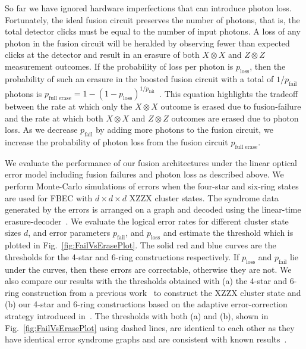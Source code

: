 \documentclass[reprint,
groupedaddress,
 prl,amsmath,amssymb,
 aps]{revtex4-2}
\theoremstyle{definition}
\begin{document}
\begin{bibunit}
So far we have ignored hardware imperfections that can introduce photon loss. Fortunately, the ideal fusion circuit preserves the number of photons, that is, the total detector clicks must be equal to the number of input photons. A loss of any photon in the fusion circuit will be heralded by observing fewer than expected clicks at the detector and result in an erasure of both $X\otimes X$ and $Z\otimes Z$ measurement outcomes. If the probability of loss per photon is $p_\mathrm{loss}$, then the probability of such an erasure in the boosted fusion circuit with a total of $1/p_\mathrm{fail}$ photons is $p_\mathrm{full\; erase}=1-(1-p_\mathrm{loss})^{1/p_\mathrm{fail}}$~\cite{bartolucci2021fusion}. This equation highlights the tradeoff between the rate at which only the $X\otimes X$ outcome is erased due to fusion-failure and the rate at which both $X\otimes X$ and $Z\otimes Z$ outcomes are erased due to photon loss. As we decrease $p_\mathrm{fail}$ by adding more photons to the fusion circuit, we increase the probability of photon loss from the fusion circuit $p_\mathrm{full\; erase}$.
 
 
{W}e evaluate the performance of our fusion architectures under the linear optical error model including fusion failures and photon loss as described above. We perform Monte-Carlo simulations of errors when the four-star and six-ring states are used for FBEC with $d\times d\times d$ XZZX cluster states. The syndrome data generated by the errors is arranged on a graph and decoded using the linear-time erasure-decoder~\cite{delfosse2020linear}. We evaluate the logical error rates for different cluster state sizes $d$, and error parameters $p_{\mathrm{fail}}$, and $p_\mathrm{loss}$ and estimate the threshold which is plotted in Fig.~\ref{fig:FailVsErasePlot}. The solid red and blue curves are the thresholds for the 4-star and 6-ring constructions respectively. If $p_\mathrm{loss}$ and $p_\mathrm{fail}$ lie under the curves, then these errors are correctable, otherwise they are not. {{We also compare our results with the thresholds obtained with (a) the 4-star and 6-ring construction from a previous work~\cite{bartolucci2021fusion} to construct the XZZX cluster state and (b) our 4-star and 6-ring constructions based on the adaptive error-correction strategy introduced in~\cite{auger2018fault}. The thresholds with both (a) and (b), shown in Fig.~\ref{fig:FailVsErasePlot} using dashed lines, are identical to each other as they have identical error syndrome graphs and are consistent with known results~\cite{bartolucci2021fusion}.}}



\end{bibunit}
\end{document}

